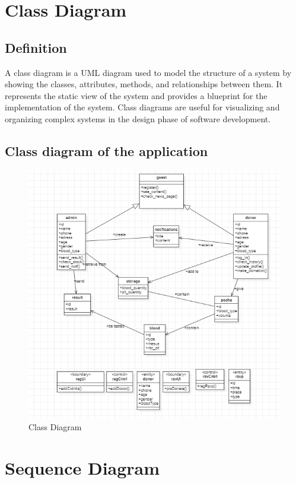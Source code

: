 \section{Class Diagram}
\subsection{Definition}
A class diagram is a UML diagram used to model the structure of a system by showing the classes, attributes, methods, and relationships between them. It represents the static view of the system and provides a blueprint for the implementation of the system. Class diagrams are useful for visualizing and organizing complex systems in the design phase of software development.
\subsection{Class diagram of the application}

\begin{figure}[H]
    \centering
    \includegraphics[width=1\textwidth]{images/niw.png}
    \caption{ Class Diagram}
    \label{fig:figure4}
\end{figure}

\section{Sequence Diagram}
